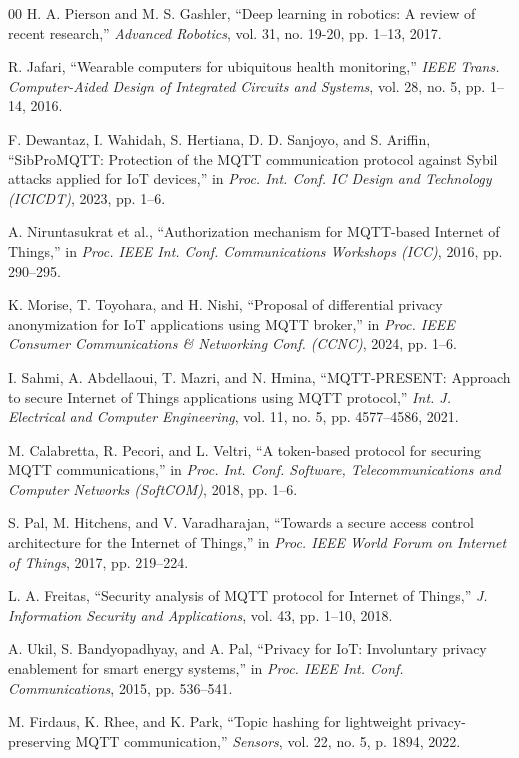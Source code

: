 \documentclass[conference]{IEEEtran}
\begin{document}
\begin{thebibliography}{00}
H. A. Pierson and M. S. Gashler, ``Deep learning in robotics: A review of recent research,'' \textit{Advanced Robotics}, vol. 31, no. 19-20, pp. 1--13, 2017.

R. Jafari, ``Wearable computers for ubiquitous health monitoring,'' \textit{IEEE Trans. Computer-Aided Design of Integrated Circuits and Systems}, vol. 28, no. 5, pp. 1--14, 2016.

F. Dewantaz, I. Wahidah, S. Hertiana, D. D. Sanjoyo, and S. Ariffin, ``SibProMQTT: Protection of the MQTT communication protocol against Sybil attacks applied for IoT devices,'' in \textit{Proc. Int. Conf. IC Design and Technology (ICICDT)}, 2023, pp. 1--6.

A. Niruntasukrat et al., ``Authorization mechanism for MQTT-based Internet of Things,'' in \textit{Proc. IEEE Int. Conf. Communications Workshops (ICC)}, 2016, pp. 290--295.

K. Morise, T. Toyohara, and H. Nishi, ``Proposal of differential privacy anonymization for IoT applications using MQTT broker,'' in \textit{Proc. IEEE Consumer Communications \& Networking Conf. (CCNC)}, 2024, pp. 1--6.

I. Sahmi, A. Abdellaoui, T. Mazri, and N. Hmina, ``MQTT-PRESENT: Approach to secure Internet of Things applications using MQTT protocol,'' \textit{Int. J. Electrical and Computer Engineering}, vol. 11, no. 5, pp. 4577--4586, 2021.

M. Calabretta, R. Pecori, and L. Veltri, ``A token-based protocol for securing MQTT communications,'' in \textit{Proc. Int. Conf. Software, Telecommunications and Computer Networks (SoftCOM)}, 2018, pp. 1--6.

S. Pal, M. Hitchens, and V. Varadharajan, ``Towards a secure access control architecture for the Internet of Things,'' in \textit{Proc. IEEE World Forum on Internet of Things}, 2017, pp. 219--224.

L. A. Freitas, ``Security analysis of MQTT protocol for Internet of Things,'' \textit{J. Information Security and Applications}, vol. 43, pp. 1--10, 2018.

A. Ukil, S. Bandyopadhyay, and A. Pal, ``Privacy for IoT: Involuntary privacy enablement for smart energy systems,'' in \textit{Proc. IEEE Int. Conf. Communications}, 2015, pp. 536--541.

M. Firdaus, K. Rhee, and K. Park, ``Topic hashing for lightweight privacy-preserving MQTT communication,'' \textit{Sensors}, vol. 22, no. 5, p. 1894, 2022.

\end{thebibliography}
\end{document}
